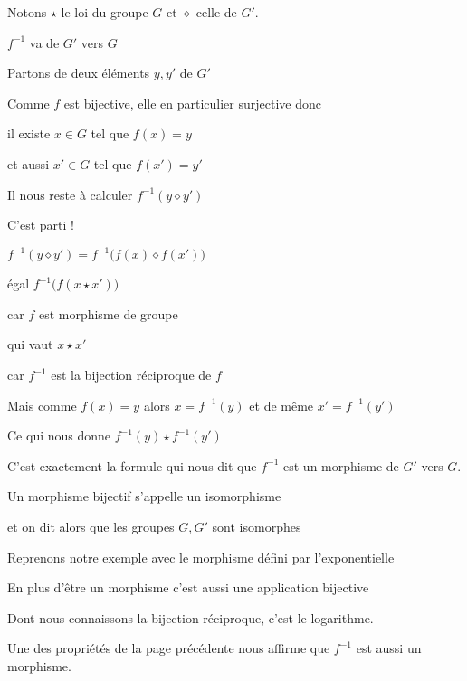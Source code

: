 Notons $\star$ le loi du groupe $G$ et $\diamond$ celle de $G'$.

\change

$f^{-1}$ va de $G'$ vers $G$

\change

Partons de deux éléments $y,y'$ de $G'$

Comme $f$ est bijective, elle en particulier surjective donc

il existe $x \in G$ tel que $f(x)=y$ 

et aussi $x' \in G$ tel que $f(x')=y'$


Il nous reste à calculer 
$f^{-1}(y\diamond y') $




\change

C'est parti !

$f^{-1}(y\diamond y') =  f^{-1}\big(f(x)\diamond f(x') \big)$

\change

égal $f^{-1}\big(f(x \star x') \big) $

car $f$ est morphisme de groupe 

\change

qui vaut $ x\star x'$

car $f^{-1}$ est la bijection réciproque de $f$

\change

Mais comme $f(x)=y$ alors $x=f^{-1}(y)$
et de même $x'=f^{-1}(y')$

Ce qui nous donne 
$f^{-1}(y)\star f^{-1}(y')$

C'est exactement la formule qui nous dit
que $f^{-1}$ est un morphisme de $G'$ vers $G$.


\diapo


Un morphisme bijectif s'appelle un isomorphisme


et on dit alors que les groupes $G, G'$ sont isomorphes

\change


Reprenons notre exemple avec le morphisme défini par l'exponentielle

\change


En plus d'être un morphisme c'est aussi une application bijective

\change

Dont nous connaissons la bijection réciproque, c'est le logarithme.

\change

Une des propriétés de la page précédente nous affirme que $f^{-1}$ est aussi un morphisme.


